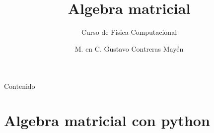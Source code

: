 


\normalfont
\usepackage{ccfonts}%
\usepackage[T1]{fontenc}%
\renewcommand{\rmdefault}{cmr}%
\linespread{1.3}
\title{Algebra matricial}
\subtitle{Curso de Física Computacional}
\author[]{M. en C. Gustavo Contreras Mayén}
\newcommand{\seti}{\setcounter{saveenumi}{\value{enumi}}}
\newcommand{\conti}{\setcounter{enumi}{\value{saveenumi}}}

\newcommand{\localtextbulletone}{\textcolor{gray}{\raisebox{.45ex}{\rule{.6ex}{.6ex}}}}
\maketitle
\fontsize{14}{14}\selectfont
{}
\begin{frame}{Contenido}
\tableofcontents[pausesections]
\end{frame}
\section{Algebra matricial con python}
